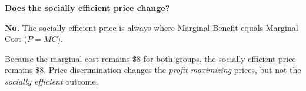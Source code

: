 \documentclass[12pt]{article}
\begin{document}
\begin{subqs}
\item \textbf{Does the socially efficient price change?}
  \begin{solbullets}
    \item \textbf{No.} The socially efficient price is always where Marginal Benefit equals Marginal Cost ($P = MC$).
    \item Because the marginal cost remains $\$8$ for both groups, the socially efficient price remains $\$8$. Price discrimination changes the \textit{profit-maximizing} prices, but not the \textit{socially efficient} outcome.
  \end{solbullets}

\end{subqs}
\end{document}
